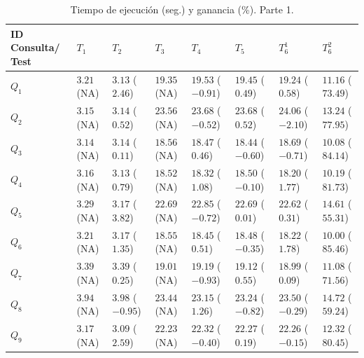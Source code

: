 \begin{table}[!h]
\renewcommand{\arraystretch}{1.3}
\begin{center}
\begin{tabular}{|p{1.5cm}|p{1.5cm}|p{1.5cm}|p{1.5cm}|p{1.5cm}|p{1.5cm}|p{1.5cm}|p{1.5cm}|}
\hline
\textbf{ID Consulta/ Test} & $T_1$ & $T_2$ & $T_3$ & $T_4$ & $T_5$ & $T^{1}_{6}$ & $T^{2}_{6}$ \\ \hline
  $Q_1$ & $3.21$ (NA) & $3.13$ ($2.46$) & $19.35$ (NA) & $19.53$ ($-0.91$) & $19.45$ ($0.49$)  & $19.24$ ($0.58$) & $11.16$ ($73.49$)\\ \hline
  $Q_2$ & $3.15$ (NA) & $3.14$ ($0.52$) & $23.56$ (NA)   & $23.68$ ($-0.52$)  & $23.68$ ($0.52$) & $24.06$ ($-2.10$) & $13.24$ ($77.95$) \\ \hline
  $Q_3$ & $3.14$ (NA)  & $3.14$ ($0.11$) & $18.56$ (NA)  & $18.47$ ($0.46$)  & $18.44$ ($-0.60$)  & $18.69$ ($-0.71$)  & $10.08$ ($84.14$) \\ \hline
  $Q_4$ & $3.16$ (NA)  & $3.13$ ($0.79$) & $18.52$ (NA)  & $18.32$ ($1.08$)  & $18.50$ ($-0.10$)  & $18.20$ ($1.77$)  & $10.19$ ($81.73$) \\ \hline
  $Q_5$ & $3.29$ (NA)  & $3.17$ ($3.82$) & $22.69$ (NA)  & $22.85$ ($-0.72$)  & $22.69$ ($0.01$)  & $22.62$ ($0.31$)  & $14.61$ ($55.31$) \\ \hline
  $Q_6$ & $3.21$ (NA)  & $3.17$ ($1.35$) & $18.55$ (NA)  & $18.45$ ($0.51$)  & $18.48$ ($-0.35$)  & $18.22$ ($1.78$)  & $10.00$ ($85.46$) \\ \hline
  $Q_7$ & $3.39$ (NA)  & $3.39$ ($0.25$) & $19.01$ (NA)  & $19.19$ ($-0.93$)  & $19.12$ ($0.55$)  & $18.99$ ($0.09$)  & $11.08$ ($71.56$) \\ \hline
  $Q_8$ & $3.94$ (NA)  & $3.98$ ($-0.95$)& $23.44$ (NA)  & $23.15$ ($1.26$)  & $23.24$ ($-0.82$)  & $23.50$ ($-0.29$)  & $14.72$ ($59.24$) \\ \hline
  $Q_9$ & $3.17$ (NA)  & $3.09$ ($2.59$) & $22.23$ (NA)  & $22.32$ ($-0.40$)  & $22.27$ ($0.19$)  & $22.26$ ($-0.15$)  & $12.32$ ($80.45$) \\ \hline
  \hline
  \end{tabular}
  \caption{Tiempo de ejecución (seg.) y ganancia (\%). Parte 1.}
  \label{tabla:results-1}
  \end{center}
\end{table} 


